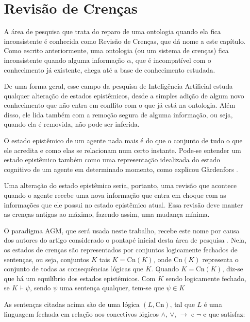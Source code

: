 
\chapter{Revisão de Crenças}

\lettrine{A}{} área de pesquisa que trata do reparo de uma ontologia quando ela fica inconsistente é conhecida como Revisão de Crenças, que dá nome a este capítulo. Como escrito anteriormente, uma ontologia (ou um sistema de crenças) fica inconsistente quando alguma informação $ \alpha $, que é incompatível com o conhecimento já existente, chega até a base de conhecimento estudada. 

De uma forma geral, esse campo da pesquisa de Inteligência Artificial estuda qualquer alteração de estados epistêmicos, desde a simples adição de algum novo conhecimento que não entra em conflito com o que já está na ontologia. Além disso, ele lida também com a remoção segura de alguma informação, ou seja, quando ela é removida, não pode ser inferida.

O estado epistêmico de um agente nada mais é do que o conjunto de tudo o que ele acredita e como elas se relacionam num certo instante. Pode-se entender um estado epistêmico também como uma representação idealizada do estado cognitivo de um agente em determinado momento, como explicou Gärdenfors \cite{revisaoGardenfors}.

Uma alteração do estado epistêmico seria, portanto, uma revisão que acontece quando o agente recebe uma nova informação que entra em choque com as informações que ele possui no estado epistêmico atual. Essa revisão deve manter as crenças antigas ao máximo, fazendo assim, uma mudança mínima.

O paradigma AGM, que será usada neste trabalho, recebe este nome por causa dos autores do artigo considerado o pontapé inicial desta área de pesquisa \cite{revisaoAGM}. Nela, os estados de crenças são representados por conjuntos logicamente fechados de sentenças, ou seja, conjuntos $ K $ tais $ K = \text{Cn}(K) $, onde $ \text{Cn}(K) $ representa o conjunto de todas as consequências lógicas que $ K $. Quando $ K = \text{Cn}(K) $, diz-se que há um equilíbrio dos estados epistêmicos. Com $ K $ sendo logicamente fechado, se $ K \vdash \psi $, sendo $ \psi $ uma sentença qualquer, tem-se que $ \psi \in K $

As sentenças citadas acima são de uma lógica $ (L, \text{Cn}) $, tal que $ L $ é uma linguagem fechada em relação aos conectivos lógicos $ \land $, $ \lor $, $ \to $ e $ \lnot $ e que satisfaz:

